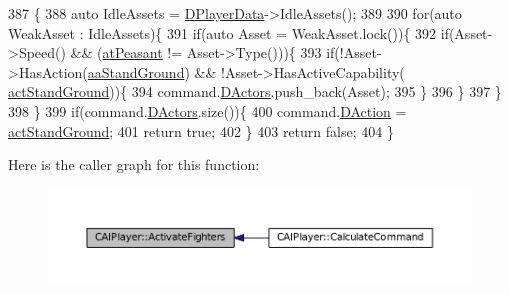 \begin{DoxyCode}
387                                                               \{
388     \textcolor{keyword}{auto} IdleAssets = \hyperlink{classCAIPlayer_a83b5113c8f7e80df54940b647c5ee2e6}{DPlayerData}->IdleAssets();
389     
390     \textcolor{keywordflow}{for}(\textcolor{keyword}{auto} WeakAsset : IdleAssets)\{
391         \textcolor{keywordflow}{if}(\textcolor{keyword}{auto} Asset = WeakAsset.lock())\{
392             \textcolor{keywordflow}{if}(Asset->Speed() && (\hyperlink{GameDataTypes_8h_a5600d4fc433b83300308921974477fecaf5e570c7e5a2266810f610e7f945ea61}{atPeasant} != Asset->Type()))\{
393                 \textcolor{keywordflow}{if}(!Asset->HasAction(\hyperlink{GameDataTypes_8h_ab47668e651a3032cfb9c40ea2d60d670abd8a4e07a8f888148ed62ddd46719af3}{aaStandGround}) && !Asset->HasActiveCapability(
      \hyperlink{GameDataTypes_8h_a35b98ce26aca678b03c6f9f76e4778cea60ecb1b155c04190174a46d8053b5a04}{actStandGround}))\{
394                     command.\hyperlink{structSPlayerCommandRequest_aa37fc01519676345703d78b9f573894a}{DActors}.push\_back(Asset);
395                 \}
396             \}
397         \}
398     \}
399     \textcolor{keywordflow}{if}(command.\hyperlink{structSPlayerCommandRequest_aa37fc01519676345703d78b9f573894a}{DActors}.size())\{
400         command.\hyperlink{structSPlayerCommandRequest_a80897bbccf2c4e0b148a7aa815a926c6}{DAction} = \hyperlink{GameDataTypes_8h_a35b98ce26aca678b03c6f9f76e4778cea60ecb1b155c04190174a46d8053b5a04}{actStandGround};
401         \textcolor{keywordflow}{return} \textcolor{keyword}{true};
402     \}
403     \textcolor{keywordflow}{return} \textcolor{keyword}{false};
404 \}
\end{DoxyCode}
Here is the caller graph for this function\+:
\nopagebreak
\begin{figure}[H]
\begin{center}
\leavevmode
\includegraphics[width=350pt]{classCAIPlayer_a4216d7e76315234a4fe22fb3a0a89c1d_icgraph}
\end{center}
\end{figure}
\hypertarget{classCAIPlayer_a3fab1c955fd68bb53fa80bb1872d2819}{}\label{classCAIPlayer_a3fab1c955fd68bb53fa80bb1872d2819} 
